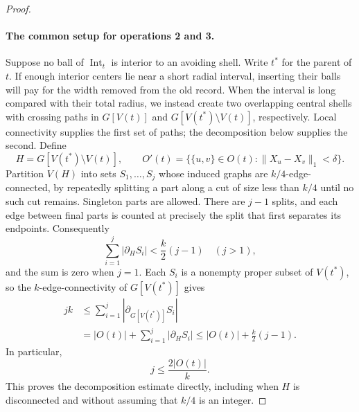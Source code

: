 \begin{proof}
\paragraph{\textbf{The common setup for operations 2 and 3.}}
Suppose no ball of $\operatorname{Int}_t$ is interior to an avoiding
shell.  Write $t^*$ for the parent of $t$.
If enough interior centers lie near a short radial interval, inserting
their balls will pay for the width removed from the old record.
When the interval is long compared with their total radius, we instead
create two overlapping central shells with crossing paths in
$G[V(t)]$ and $G[V(t^*)\setminus V(t)]$, respectively.
Local connectivity supplies the first set of paths; the decomposition
below supplies the second.  Define
\[
 H=G[V(t^*)\setminus V(t)],\qquad
 O'(t)=\{\{u,v\}\in O(t):\|X_u-X_v\|_1<\delta\}.
\]
Partition $V(H)$ into sets $S_1,\ldots,S_j$ whose induced graphs are
$k/4$-edge-connected, by repeatedly splitting a part along a cut of
size less than $k/4$ until no such cut remains.  Singleton parts are
allowed.  There are $j-1$ splits, and each edge between final parts is
counted at precisely the split that first separates its endpoints.
Consequently
\[
 \sum_{i=1}^j|\partial_H S_i|
    <\frac{k}{2}(j-1)\quad(j>1),
\]
and the sum is zero when $j=1$.  Each $S_i$ is a nonempty proper subset
of $V(t^*)$, so the $k$-edge-connectivity of $G[V(t^*)]$ gives
\begin{align*}
 jk
 &\leq\sum_{i=1}^j|\partial_{G[V(t^*)]}S_i|\\
 &=|O(t)|+\sum_{i=1}^j|\partial_H S_i|
 \leq |O(t)|+\frac{k}{2}(j-1).
\end{align*}
In particular,
\begin{equation}
 j\leq\frac{2|O(t)|}{k}.
 \label{ha:component-count}
\end{equation}
This proves the decomposition estimate directly, including when $H$
is disconnected and without assuming that $k/4$ is an integer.


\end{proof}
